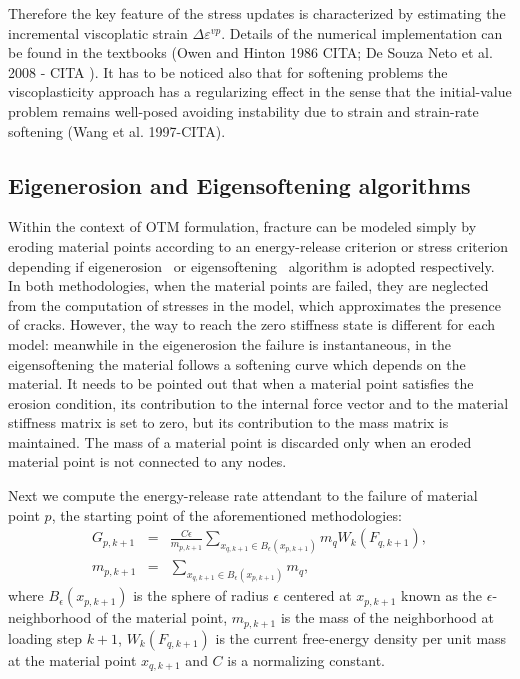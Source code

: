 \documentclass[applsci,journal,article,submit,moreauthors,pdftex]{Definitions/mdpi}
\begin{document}
Therefore the key feature of the stress updates is characterized by estimating the incremental viscoplatic strain $\Delta \varepsilon^{v p}.$ Details of the numerical implementation can be found in the textbooks (Owen and Hinton 1986 CITA; De Souza Neto et al. 2008 - CITA ). It has to be noticed also that for softening problems the viscoplasticity approach has a regularizing effect in the sense that the initial-value problem remains well-posed avoiding instability due to strain and strain-rate softening (Wang et al. 1997-CITA).


\subsection{Eigenerosion and Eigensoftening algorithms}

Within the context of OTM formulation, fracture can be modeled simply by eroding material points according to an energy-release criterion or stress criterion depending if eigenerosion~\cite{schmidt09, Pandolfi_12, Li_12, Pandolfi_13} or eigensoftening~\cite{Navas2018b,Molinos2020b} algorithm is adopted respectively. In both methodologies, when the material points are failed, they are neglected from the computation of stresses in the model, which approximates the presence of cracks. However, the way to reach the zero stiffness state is different for each model: meanwhile in the eigenerosion the failure is instantaneous, in the eigensoftening the material follows a softening curve which depends on the material. It needs to be pointed out that when a material point satisfies the erosion condition, its contribution to the internal force vector and to the material stiffness matrix is set to zero, but its contribution to the mass matrix is maintained. The mass of a material point is discarded only when an eroded material point is not connected to any nodes.

Next we compute the energy-release rate attendant to the failure of material point $p$, the starting point of the aforementioned methodologies:
\begin{eqnarray}
G_{p,k+1}&=&\frac{C\epsilon}{m_{p,k+1}}\sum_{x_{q,k+1}\in B_\epsilon (x_{p,k+1})}m_qW_k(F_{q,k+1}), \nonumber\\
m_{p,k+1}&=&\sum_{x_{q,k+1}\in B_\epsilon (x_{p,k+1})}m_q\label{eq10},
\end{eqnarray}
where $B_\epsilon (x_{p,k+1})$ is the sphere of radius $\epsilon$ centered at $x_{p,k+1}$ known as the $\epsilon$-neighborhood of the material point, $m_{p,k+1}$ is the mass of the neighborhood at loading step $k+1$, $W_k(F_{q,k+1})$ is the current free-energy density per unit mass at the material point $x_{q, k+1}$ and $C$ is a normalizing constant. 
\end{document}
